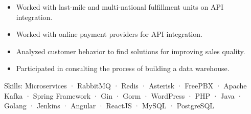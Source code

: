 {\begin{cvitems}
{\begin{itemize}
                \item { Worked with last-mile and multi-national fulfillment units on API integration. }
                \item { Worked with online payment providers for API integration. }
                \item { Analyzed customer behavior to find solutions for improving sales quality. }
                \item { Participated in consulting the process of building a data warehouse. }
            \end{itemize}
        }
        \item {Skills: Microservices · RabbitMQ · Redis · Asterisk · FreePBX · Apache Kafka · Spring Framework · Gin · Gorm · WordPress · PHP · Java · Golang · Jenkins · Angular · ReactJS · MySQL · PostgreSQL}
      \end{cvitems}
    }
